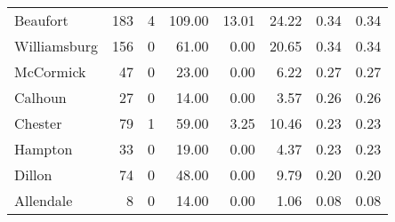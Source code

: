 \begin{tabular}{lrrrrrrr}
    Beaufort &   183 &      4 & 109.00 &      13.01 &     24.22 &         0.34 &      0.34 \\
Williamsburg &   156 &      0 &  61.00 &       0.00 &     20.65 &         0.34 &      0.34 \\
   McCormick &    47 &      0 &  23.00 &       0.00 &      6.22 &         0.27 &      0.27 \\
     Calhoun &    27 &      0 &  14.00 &       0.00 &      3.57 &         0.26 &      0.26 \\
     Chester &    79 &      1 &  59.00 &       3.25 &     10.46 &         0.23 &      0.23 \\
     Hampton &    33 &      0 &  19.00 &       0.00 &      4.37 &         0.23 &      0.23 \\
      Dillon &    74 &      0 &  48.00 &       0.00 &      9.79 &         0.20 &      0.20 \\
   Allendale &     8 &      0 &  14.00 &       0.00 &      1.06 &         0.08 &      0.08 \\
\bottomrule
\end{tabular}
